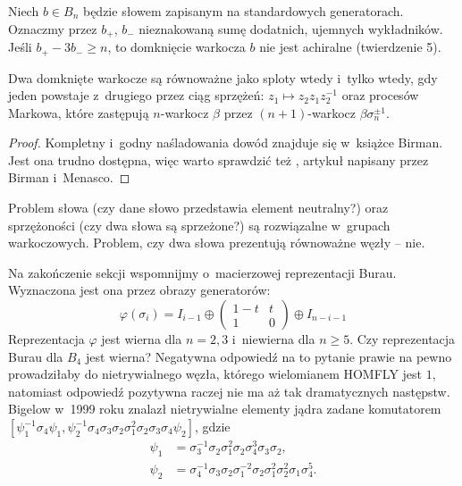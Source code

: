 Niech $b \in B_n$ będzie słowem zapisanym na standardowych generatorach.
Oznaczmy przez $b_+$, $b_-$ nieznakowaną sumę dodatnich, ujemnych wykładników.
Jeśli $b_+ - 3b_- \ge n$, to domknięcie warkocza $b$ nie jest achiralne (twierdzenie 5).

\begin{theorem}[Markow, 1936]
    Dwa domknięte warkocze są równoważne jako sploty wtedy i~tylko wtedy,
    gdy jeden powstaje z~drugiego przez ciąg
    sprzężeń: $z_1 \mapsto z_2 z_1 z_2^{-1}$ oraz procesów Markowa,
    które zastępują $n$-warkocz $\beta$ przez $(n+1)$-warkocz $\beta\sigma_n^{\pm 1}$.
\end{theorem}

\begin{proof}
    Kompletny i~godny naśladowania dowód znajduje się w~książce \cite{birman74} Birman.
    Jest ona trudno dostępna, więc warto sprawdzić też \cite{birman02}, artykuł napisany przez Birman i~Menasco.
\end{proof}

Problem słowa (czy dane słowo przedstawia element neutralny?) oraz sprzężoności (czy dwa słowa są sprzeżone?) są rozwiązalne w~grupach warkoczowych.
Problem, czy dwa słowa prezentują równoważne węzły -- nie.

Na zakończenie sekcji wspomnijmy o~macierzowej reprezentacji Burau.
Wyznaczona jest ona przez obrazy generatorów:
\[
    \varphi(\sigma_i) = I_{i-1} \oplus \begin{pmatrix}
        1-t & t \\
        1   & 0
    \end{pmatrix} \oplus I_{n-i-1}
\]
Reprezentacja $\varphi$ jest wierna dla $n = 2, 3$ i~niewierna dla $n \ge 5$.
Czy reprezentacja Burau dla $B_4$ jest wierna?
Negatywna odpowiedź na to pytanie prawie na pewno prowadziłaby do
nietrywialnego węzła, którego wielomianem HOMFLY jest $1$,
natomiast odpowiedź pozytywna raczej nie ma aż tak dramatycznych następstw.
Bigelow w~1999 roku znalazł nietrywialne elementy jądra zadane komutatorem $[\psi_1^{{-1}}\sigma_4\psi_1,\psi_2^{{-1}}\sigma_4\sigma_3\sigma_2\sigma_1^2\sigma_2\sigma_3\sigma_4\psi_2]$, gdzie
    \begin{align*}
        \psi_1 & = \sigma_3^{{-1}}\sigma_2\sigma_1^2\sigma_2\sigma_4^3\sigma_3\sigma_2, \\
\psi_2 & = \sigma_4^{{-1}}\sigma_3\sigma_2\sigma_1^{{-2}}\sigma_2\sigma_1^2\sigma_2^2\sigma_1\sigma_4^5.
    \end{align*}

